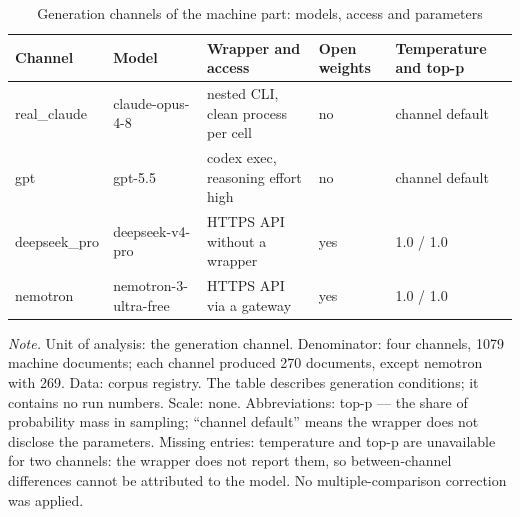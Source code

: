 \begin{table}[htbp]
\centering
\small
\caption{Generation channels of the machine part: models, access and parameters}
\label{tab:s2}
\begin{tabular}{lllll}
\toprule
Channel & Model & Wrapper and access & Open weights & Temperature and top-p \\
\midrule
real\_claude & claude-opus-4-8 & nested CLI, clean process per cell & no & channel default \\
gpt & gpt-5.5 & codex exec, reasoning effort high & no & channel default \\
deepseek\_pro & deepseek-v4-pro & HTTPS API without a wrapper & yes & 1.0 / 1.0 \\
nemotron & nemotron-3-ultra-free & HTTPS API via a gateway & yes & 1.0 / 1.0 \\
\bottomrule
\end{tabular}
\begin{minipage}{\linewidth}\footnotesize\vspace{2pt}
\textit{Note.} Unit of analysis: the generation channel. Denominator: four channels, 1079 machine documents; each channel produced 270 documents, except nemotron with 269. Data: corpus registry. The table describes generation conditions; it contains no run numbers. Scale: none. Abbreviations: top-p — the share of probability mass in sampling; ``channel default'' means the wrapper does not disclose the parameters. Missing entries: temperature and top-p are unavailable for two channels: the wrapper does not report them, so between-channel differences cannot be attributed to the model. No multiple-comparison correction was applied.
\end{minipage}
\end{table}
